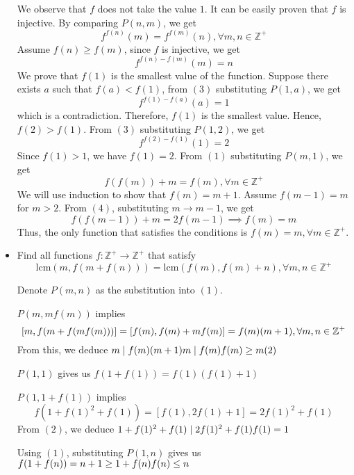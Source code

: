 \documentclass[11pt]{scrartcl}
\begin{document}
\begin{itemize}[label=, leftmargin=0em, itemsep=0.2em]
\begin{sol}
        We observe that $f$ does not take the value $1$. It can be easily proven that $f$ is injective. By comparing $P(n,m)$, we get 
        \[
            f^{f(n)}(m) = f^{f(m)}(n) , \forall m,n \in \mathbb{Z}^+
        \]
        Assume $f(n) \geq f(m)$, since $f$ is injective, we get 
        \[
            f^{f(n) - f(m)}(m) = n \tag{3}
        \]
        We prove that $f(1)$ is the smallest value of the function. Suppose there exists $a$ such that $f(a) < f(1)$, from $(3)$ substituting $P(1,a)$, we get 
        \[
            f^{f(1) - f(a)}(a) = 1
        \]
        which is a contradiction. Therefore, $f(1)$ is the smallest value. Hence, $f(2) > f(1)$. From $(3)$ substituting $P(1,2)$, we get 
        \[
            f^{f(2) - f(1)}(1) = 2
        \]
        Since $f(1) > 1$, we have $f(1) = 2$. From $(1)$ substituting $P(m,1)$, we get
        \[
            f(f(m)) + m = f(m), \forall m \in \mathbb{Z}^+ \tag{4}
        \]
        We will use induction to show that $f(m) = m + 1$. Assume $f(m - 1) = m$ for $m > 2$. From $(4)$, substituting $m \to m - 1$, we get
        \[
            f(f(m - 1)) + m = 2f(m - 1) \implies f(m) = m
        \]
        Thus, the only function that satisfies the conditions is $\boxed{f(m) = m, \forall m \in \mathbb{Z}^+}$.

    \end{sol} 


    \item \begin{bt}
        Find all functions $f: \mathbb{Z^+} \to \mathbb{Z^+}$ that satisfy
        \[
        \text{lcm}(m, f(m+f(n)))=\text{lcm}(f(m), f(m)+n), \forall m,n \in \mathbb{Z}^+
        \tag{1}\]
    \end{bt}
    \begin{sol}
        Denote $P(m,n)$ as the substitution into $(1)$.

        $P(m,mf(m))$ implies
        \[[m, f(m + f(mf(m)))] = [f(m), f(m) + mf(m)] = f(m)(m + 1), \forall m,n \in \mathbb{Z^+}\]
        From this, we deduce $m \mid f(m)(m + 1) \ra m \mid f(m) \ra f(m) \geq m (2)$

        $P(1,1)$ gives us $f(1 + f(1)) = f(1)(f(1) + 1)$

        $P(1, 1 + f(1))$ implies
        \[
        f(1 + f(1)^2 + f(1)) = [f(1), 2f(1) + 1] = 2f(1)^2 + f(1)
        \]
        From $(2)$, we deduce $1 + f(1)^2 + f(1) \mid 2f(1)^2 + f(1) \ra f(1) = 1$

        Using $(1)$, substituting $P(1,n)$ gives us $f(1 + f(n)) = n + 1 \geq 1 + f(n) \ra f(n) \leq n$


\end{sol}
\end{itemize}
\end{document}
